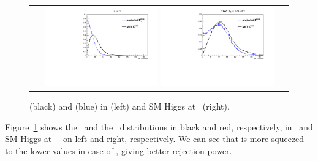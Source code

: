 \begin{figure}[htp] 
\centering 
\begin{tabular}{c} 
\includegraphics[width=0.45\textwidth]{figures/pmet_met_ztt.pdf} 
\includegraphics[width=0.45\textwidth]{figures/pmet_met_hww125.pdf} 
\end{tabular} 
\caption{\met(black) and \pmet(blue) in \dytt(left) and SM Higgs at ~\GeV(right).}
\label{fig:projmet} 
\end{figure}  
Figure~\ref{fig:projmet} shows the \met\ and the \pmet\ distributions 
in black and red, respectively, in \dytt\ and SM Higgs at ~\GeV\
on left and right, respectively. We can see that \pmet is more squeezed to 
the lower values in case of \dytt, giving better rejection power.  

